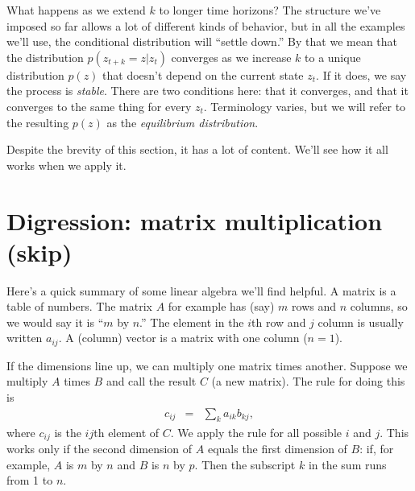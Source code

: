 \documentclass[11pt]{article}
\begin{document}
What happens as we extend $k$ to longer time horizons?
The structure we've imposed so far allows a lot of different kinds
of behavior, but in all the examples we'll use,
the conditional distribution will ``settle down.''
By that we mean that the distribution $ p(z_{t+k} = z | z_t)$
converges as we increase $k$ to a unique distribution $p(z)$
that doesn't depend on the current state $z_t$.
If it does, we say the process is {\it stable\/}.
There are two conditions here:  that it converges, and that it converges
to the same thing for every $z_t$.
Terminology varies, but we will refer to the resulting $p(z)$ as the
{\it equilibrium distribution\/}.

Despite the brevity of this section, it has a lot of content.
We'll see how it all works when we apply it.


\section{Digression:  matrix multiplication (skip)}

Here's a quick summary of some linear algebra we'll find helpful.
A matrix is a table of numbers.
The matrix $A$ for example has (say) $m$ rows and $n$ columns,
so we would say it is ``$m$ by $n$.''
The element in the $i$th row and $j$ column is usually written $a_{ij}$.
A (column) vector is a matrix with one column ($n=1$).

If the dimensions line up, we can multiply
one matrix times another.
Suppose we multiply $A$ times $B$ and call the result $C$ (a new matrix).
The rule for doing this is
\begin{eqnarray*}
    c_{ij} &=& \sum_k a_{ik} b_{kj} ,
\end{eqnarray*}
where $c_{ij}$ is the $ij$th element of $C$.
We apply the rule for all possible $i$ and $j$.
This works only if the second dimension of $A$ equals the first dimension of $B$:
if, for example, $A$ is $m$ by $n$ and $B$ is $n$ by $p$.
Then the subscript $k$ in the sum runs from 1 to $n$.
\end{document}
